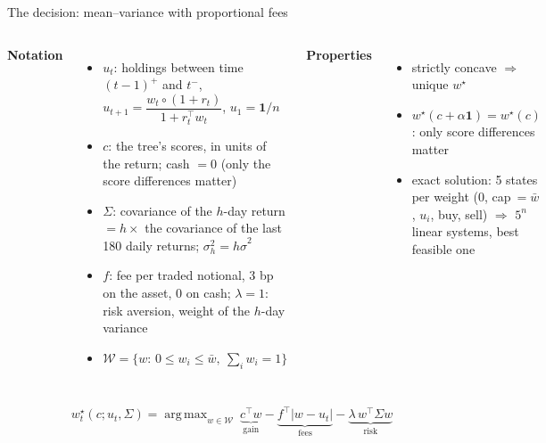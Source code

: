 \documentclass[10pt,aspectratio=169]{beamer}
\newcommand{\1}{\mathbf{1}}
\newcommand{\W}{\mathcal{W}}
\DeclareMathOperator*{\argmax}{arg\,max}
\begin{document}
\begin{frame}{The decision: mean--variance with proportional fees}
\footnotesize
\begin{columns}[T]
\textbf{Notation}
\begin{itemize}
\item $u_t$: holdings between time $\left(t-1\right)^+$ and $t^-$, $u_{t+1}=\dfrac{w_t\circ(1+r_t)}{1+r_t^\top w_t}$, $u_1=\1/n$
\item $c$: the tree's scores, in units of the return; cash $=0$ (only the score differences matter)
\item $\Sigma$: covariance of the $h$-day return $=h\times$ the covariance of the last 180 daily returns; $\sigma_h^2=h\hat\sigma^2$
\item $f$: fee per traded notional, 3 bp on the asset, 0 on cash; $\lambda=1$: risk aversion, weight of the $h$-day variance
\item $\W=\{w:\,0\le w_i\le\bar{w},\ \sum_iw_i=1\}$
\end{itemize}
\textbf{Properties}
\begin{itemize}
\item strictly concave $\Rightarrow$ unique $w^\star$
\item $w^\star(c+\alpha\1)=w^\star(c)$: only score differences matter
\item exact solution: 5 states per weight ($0$, cap$\ =\bar{w}$, $u_i$, buy, sell) $\Rightarrow$ $5^n$ linear systems, best feasible one
\end{itemize}
\end{columns}
\[
w^\star_t(c;u_t,\Sigma)=\argmax_{w\in\W}\ \underbrace{c^\top w}_{\text{gain}}-\underbrace{f^\top|w-u_t|}_{\text{fees}}-\underbrace{\lambda\,w^\top\Sigma w}_{\text{risk}}
\]
\end{frame}
\end{document}
